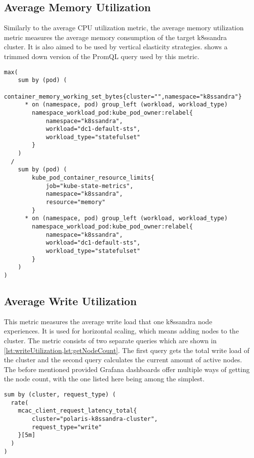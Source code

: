 \subsection{Average Memory Utilization}

Similarly to the average CPU utilization metric, the average memory utilization metric measures the average memory consumption of the target k8ssandra cluster. It is also aimed to be used by vertical elasticity strategies.  shows a trimmed down version of the PromQL query used by this metric.

\begin{lstlisting}[caption={PromQL query used for the average memory utilization metric},
                    captionpos=b,
                    label=lst:avgMemoryUtilization,
                    float]
max(
    sum by (pod) (
        container_memory_working_set_bytes{cluster="",namespace="k8ssandra"}
      * on (namespace, pod) group_left (workload, workload_type)
        namespace_workload_pod:kube_pod_owner:relabel{
            namespace="k8ssandra",
            workload="dc1-default-sts",
            workload_type="statefulset"
        }
    )
  /
    sum by (pod) (
        kube_pod_container_resource_limits{
            job="kube-state-metrics",
            namespace="k8ssandra",
            resource="memory"
        }
      * on (namespace, pod) group_left (workload, workload_type)
        namespace_workload_pod:kube_pod_owner:relabel{
            namespace="k8ssandra",
            workload="dc1-default-sts",
            workload_type="statefulset"
        }
    )
)
\end{lstlisting}

\subsection{Average Write Utilization}

This metric measures the average write load that one k8ssandra node experiences. It is used for horizontal scaling, which means adding nodes to the cluster. The metric consists of two separate queries which are shown in \cref{lst:writeUtilization,lst:getNodeCount}. The first query gets the total write load of the cluster and the second query calculates the current amount of active nodes. The before mentioned provided Grafana dashboards offer multiple ways of getting the node count, with the one listed here being among the simplest.

\begin{lstlisting}[caption={PromQL query used to get the current write throughput},
                    captionpos=b,
                    label=lst:writeUtilization,
                    float]
sum by (cluster, request_type) (
  rate(
    mcac_client_request_latency_total{
        cluster="polaris-k8ssandra-cluster",
        request_type="write"
    }[5m]
  )
)
\end{lstlisting}

